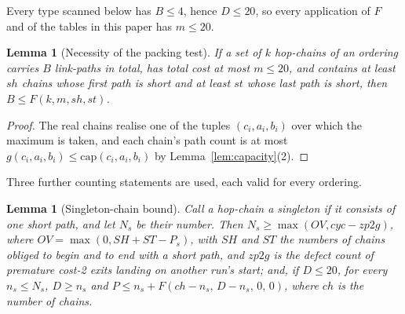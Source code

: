 \documentclass[10pt]{article}
\newtheorem{lemma}[theorem]{Lemma}
\theoremstyle{remark}
\theoremstyle{plain}
\newcommand{\NCh}{\mathit{ch}}
\newcommand{\Ncyc}{\mathit{cyc}}
\begin{document}
Every type scanned below has $B\le 4$, hence $D\le 20$, so every
application of $F$ and of the tables in this paper has $m\le 20$.

\begin{lemma}[Necessity of the packing test]\label{lem:Fnec}
If a set of $k$ hop-chains of an ordering carries $B$ link-paths in
total, has total cost at most $m\le 20$, and contains at least
$\mathit{sh}$ chains whose first path is short and at least
$\mathit{st}$ whose last path is short, then
$B\le F(k,m,\mathit{sh},\mathit{st})$.
\end{lemma}

\begin{proof}
The real chains realise one of the tuples $(c_i,a_i,b_i)$ over which
the maximum is taken, and each chain's path count is at most
$g(c_i,a_i,b_i)\le\mathrm{cap}(c_i,a_i,b_i)$ by
Lemma~\ref{lem:capacity}(2).
\end{proof}

Three further counting statements are used, each valid for every
ordering.

\begin{lemma}[Singleton-chain bound]\label{lem:singleton}
Call a hop-chain a \emph{singleton} if it consists of one short path,
and let $N_s$ be their number.  Then
$N_s\ge\max(\mathit{OV},\Ncyc-zp2g)$, where
$\mathit{OV}=\max(0,\mathit{SH}+\mathit{ST}-P_s)$, with
$\mathit{SH}$ and $\mathit{ST}$ the numbers of chains obliged to begin
and to end with a short path, and $zp2g$ is the defect count of
premature cost-2 exits landing on another run's start; and, if
$D\le 20$, for every $n_s\le N_s$, $D\ge n_s$ and
$P\le n_s+F(\NCh-n_s,\,D-n_s,\,0,\,0)$, where $\NCh$ is the number of
chains.
\end{lemma}
\end{document}
